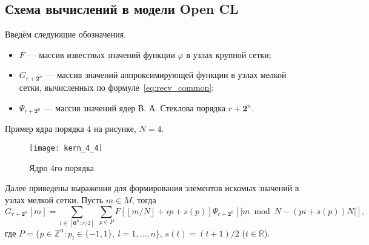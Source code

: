 
\label{sec:func_recv}

\subsection*{Схема вычислений в модели Open CL}


Введём  следующие обозначения.
\begin{itemize}

\item
  $F$  --- массив  известных значений функции $\varphi$
  в узлах крупной сетки;

\item
  $G_{r+\mathbf{2}^n}$ --- массив
  значений аппроксимирующей функции в узлах мелкой сетки,
  вычисленных по формуле~\eqref{eq:recv_common};

\item
  $\Psi_{r+\mathbf{2}^n}$ --- массив  значений ядер В. А. Стеклова порядка $r+\mathbf{2}^n$.

\end{itemize}




Пример ядра порядка 4 на рисунке, $N=4$.

\begin{figure}[h!]
  \centering
  \texttt{[image: kern\_4\_4]} 
  \caption{Ядро 4го порядка}
  \label{fig:reg_net}
\end{figure}
\FloatBarrier


 Далее приведены выражения для формирования
 элементов искомых значений в узлах мелкой сетки.
Пусть $m\in M$, тогда
\begin{equation}
  \label{eq:nd}
    G_{r+\mathbf{2}^n}[m] = 
    \sum_{i \in  [\mathbf{0}^n:r/2]}\ \sum_{p\in P} 
        F \left[ \left \lfloor {m}/{N} \right \rfloor + ip + s(p)\right]
      \Psi_{r+\mathbf{2}^n}[|m\bmod N - (pi + s(p))N|],
\end{equation}
где $P=\{p\in\mathbb{Z}^n: p_l\in\{-1,1\},\ l=1,\ldots,n\}$, $s(t)=(t+1)/2$
($t\in\mathbb{R}$).


